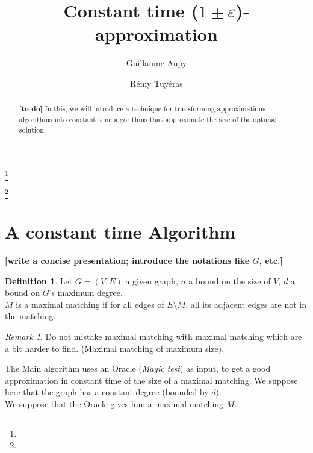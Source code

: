 \documentclass{jams-l}
\theoremstyle{definition}
\newtheorem{definition}[theorem]{Definition}
\theoremstyle{remark}
\newtheorem{remark}[theorem]{Remark}
\numberwithin{equation}{section}
\begin{document}
\title{\textbf{Constant time ($1 \pm \varepsilon$)-approximation}}


\author{Guillaume Aupy}
\address{}
\curraddr{}
\email{}
\thanks{}

\author{R\'{e}my Tuy\'{e}ras}
\address{}
\curraddr{}
\email{}
\thanks{}


\date{}

\dedicatory{}

\begin{abstract}
\textbf{[to do]}
In this, we will introduce a technique for transforming approximations algorithms
into constant time algorithms that approximate the size of the optimal solution.

\end{abstract}

\maketitle

\section{A constant time Algorithm}

\textbf{[write a concise presentation; introduce the notations like $G$, etc.]}
\begin{definition}
Let $G=(V,E)$ a given graph, $n$ a bound on the size of $V$, $d$ a bound on $G$'s 
maximum degree.\\
$M$ is a maximal matching if for all edges of $E\setminus M$, all its adjacent edges
are not in the matching.
\end{definition}

\begin{remark}
Do not mistake maximal matching with maximal matching which are a bit harder to find.
(Maximal matching of maximum size).
\end{remark}

The Main algorithm uses an Oracle (\textit{Magic test}) as input, to get a good 
approximation in constant time of the size of a maximal matching. We suppose here 
that the graph has a constant degree (bounded by $d$).\\
We suppose that the Oracle gives him a maximal matching $M$.
\end{document}
